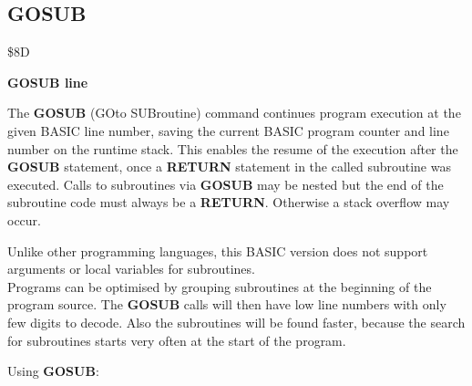
\newpage
\subsection{GOSUB}
\begin{description}[leftmargin=3cm,style=nextline]
\item [Token:] \$8D
\item [Format:] {\bf GOSUB line}
\item [Usage:] The {\bf GOSUB} (GOto SUBroutine)
               command continues program
               execution at the given BASIC line number,
               saving the current BASIC program counter
               and line number on the runtime stack.
               This enables the resume of the execution after
               the {\bf GOSUB} statement, once a {\bf RETURN}
               statement in the called subroutine was executed.
               Calls to subroutines via {\bf GOSUB} may be nested
               but the end of the subroutine code must always
               be a {\bf RETURN}. Otherwise a stack overflow
               may occur.

\item [Remarks:] Unlike other programming languages, this BASIC
               version does not support arguments or local
               variables for subroutines. \\
               Programs can be optimised by grouping subroutines
               at the beginning of the program source. The
               {\bf GOSUB} calls will then have low line numbers
               with only few digits to decode. Also the subroutines
               will be found faster, because the search for subroutines
               starts very often at the start of the program.
\item [Example:] Using {\bf GOSUB}:
\end{description}



